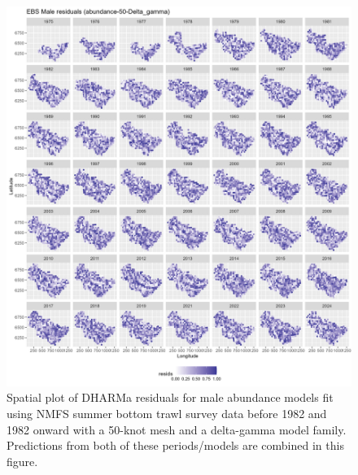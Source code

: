 \documentclass[
]{article}
\begin{document}
\begin{figure}

{\centering \includegraphics[width=1\linewidth,height=1\textheight]{../BAIRDI/Figures/DHARMa_Male_abundance-50-Delta_gamma_SPATIAL} 

}

\caption{Spatial plot of DHARMa residuals for male abundance models fit using NMFS summer bottom trawl survey data before 1982 and 1982 onward with a 50-knot mesh and a delta-gamma model family. Predictions from both of these periods/models are combined in this figure.}\label{fig:DHARMa-abund-spat-50-male}
\end{figure}
\end{document}
